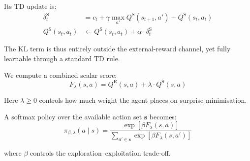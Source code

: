 \documentclass{article}
\begin{document}
Its TD update is:
\begin{align}
\delta_t^{\mathrm{S}} &= c_t + \gamma \max_{a'} Q^{\mathrm{S}}(s_{t+1}, a') - Q^{\mathrm{S}}(s_t, a_t) \\
Q^{\mathrm{S}}(s_t, a_t) &\leftarrow Q^{\mathrm{S}}(s_t, a_t) + \alpha \cdot \delta_t^{\mathrm{S}}
\end{align}

The KL term is thus entirely outside the external-reward channel, yet fully learnable through a standard TD rule.

We compute a combined scalar score:
\begin{equation}
F_\lambda(s, a) = Q^{\mathrm{R}}(s, a) + \lambda \cdot Q^{\mathrm{S}}(s, a)
\end{equation}

Here $\lambda \geq 0$ controls how much weight the agent places on surprise minimisation.

A softmax policy over the available action set $\mathbf{s}$ becomes:
\begin{equation}
\pi_{\beta, \lambda}(a \mid s) = \frac{\exp\left[\beta F_\lambda(s, a)\right]}{\sum_{a' \in \mathbf{s}} \exp\left[\beta F_\lambda(s, a')\right]}
\end{equation}

where $\beta$ controls the exploration--exploitation trade-off.
\end{document}
